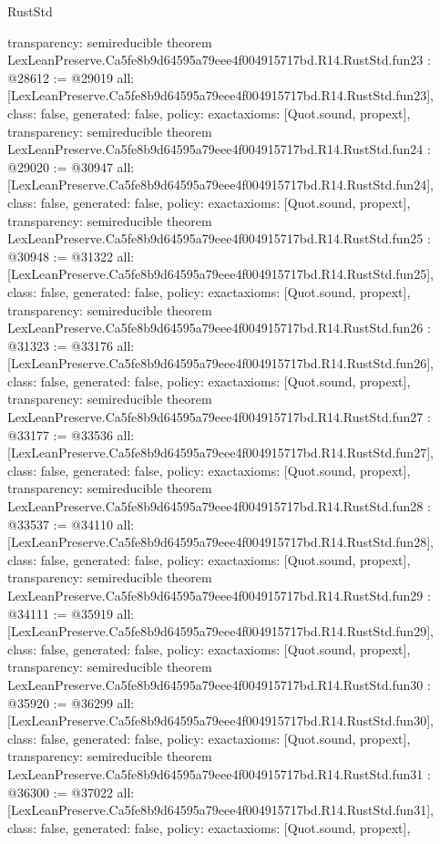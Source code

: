 \begin{lexlean}{RustStd}
\begin{coremodule}
{  transparency: semireducible
}
theorem LexLeanPreserve.Ca5fe8b9d64595a79eee4f004915717bd.R14.RustStd.fun23 : @28612 := @29019 {
  all: [LexLeanPreserve.Ca5fe8b9d64595a79eee4f004915717bd.R14.RustStd.fun23],
  class: false,
  generated: false,
  policy: exact{axioms: [Quot.sound, propext]},
  transparency: semireducible
}
theorem LexLeanPreserve.Ca5fe8b9d64595a79eee4f004915717bd.R14.RustStd.fun24 : @29020 := @30947 {
  all: [LexLeanPreserve.Ca5fe8b9d64595a79eee4f004915717bd.R14.RustStd.fun24],
  class: false,
  generated: false,
  policy: exact{axioms: [Quot.sound, propext]},
  transparency: semireducible
}
theorem LexLeanPreserve.Ca5fe8b9d64595a79eee4f004915717bd.R14.RustStd.fun25 : @30948 := @31322 {
  all: [LexLeanPreserve.Ca5fe8b9d64595a79eee4f004915717bd.R14.RustStd.fun25],
  class: false,
  generated: false,
  policy: exact{axioms: [Quot.sound, propext]},
  transparency: semireducible
}
theorem LexLeanPreserve.Ca5fe8b9d64595a79eee4f004915717bd.R14.RustStd.fun26 : @31323 := @33176 {
  all: [LexLeanPreserve.Ca5fe8b9d64595a79eee4f004915717bd.R14.RustStd.fun26],
  class: false,
  generated: false,
  policy: exact{axioms: [Quot.sound, propext]},
  transparency: semireducible
}
theorem LexLeanPreserve.Ca5fe8b9d64595a79eee4f004915717bd.R14.RustStd.fun27 : @33177 := @33536 {
  all: [LexLeanPreserve.Ca5fe8b9d64595a79eee4f004915717bd.R14.RustStd.fun27],
  class: false,
  generated: false,
  policy: exact{axioms: [Quot.sound, propext]},
  transparency: semireducible
}
theorem LexLeanPreserve.Ca5fe8b9d64595a79eee4f004915717bd.R14.RustStd.fun28 : @33537 := @34110 {
  all: [LexLeanPreserve.Ca5fe8b9d64595a79eee4f004915717bd.R14.RustStd.fun28],
  class: false,
  generated: false,
  policy: exact{axioms: [Quot.sound, propext]},
  transparency: semireducible
}
theorem LexLeanPreserve.Ca5fe8b9d64595a79eee4f004915717bd.R14.RustStd.fun29 : @34111 := @35919 {
  all: [LexLeanPreserve.Ca5fe8b9d64595a79eee4f004915717bd.R14.RustStd.fun29],
  class: false,
  generated: false,
  policy: exact{axioms: [Quot.sound, propext]},
  transparency: semireducible
}
theorem LexLeanPreserve.Ca5fe8b9d64595a79eee4f004915717bd.R14.RustStd.fun30 : @35920 := @36299 {
  all: [LexLeanPreserve.Ca5fe8b9d64595a79eee4f004915717bd.R14.RustStd.fun30],
  class: false,
  generated: false,
  policy: exact{axioms: [Quot.sound, propext]},
  transparency: semireducible
}
theorem LexLeanPreserve.Ca5fe8b9d64595a79eee4f004915717bd.R14.RustStd.fun31 : @36300 := @37022 {
  all: [LexLeanPreserve.Ca5fe8b9d64595a79eee4f004915717bd.R14.RustStd.fun31],
  class: false,
  generated: false,
  policy: exact{axioms: [Quot.sound, propext]},
}
\end{coremodule}
\end{lexlean}
